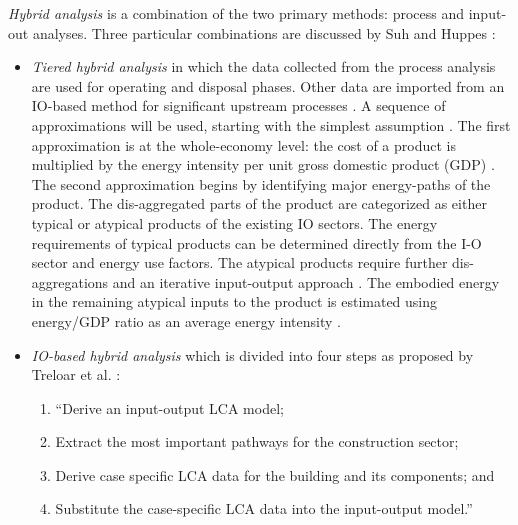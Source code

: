 \documentclass[10pt]{article}
\begin{document}

\textit{Hybrid analysis} is a combination of the two primary methods: process and input-out analyses. Three particular combinations are discussed by Suh and Huppes \cite{suh2005methods}:


\begin{itemize}
  \item \textit{Tiered hybrid analysis} in which the data collected from the process analysis are used for operating and disposal phases. Other data are imported from an IO-based method for significant upstream processes \cite{suh2005methods}.   A sequence of approximations will be used, starting with the simplest assumption \cite{bullard1978net}. The first approximation is at the whole-economy level: the cost of a product is multiplied by the energy intensity per unit gross domestic product  (GDP) \cite{bilec2006example}. The second approximation begins by identifying major energy-paths of the product. The dis-aggregated parts of the product are categorized as either typical or atypical products of the existing IO sectors. The energy requirements of typical products can be determined directly from the I-O sector and energy use factors. The atypical products require further dis-aggregations and an iterative input-output approach \cite{bilec2006example}. The embodied energy in the remaining atypical inputs to the product is estimated using energy/GDP ratio as an average energy intensity \cite{bullard1978net}.

  \item \textit{IO-based hybrid analysis} which is divided into four steps as proposed by Treloar et al. \cite{treloar2000hybrid}: 
  
  \begin{enumerate}
      \item ``Derive an input-output LCA model;
      \item Extract the most important pathways for the construction sector;
      \item Derive case specific LCA data for the building and its components; and
   \item Substitute the case-specific LCA data into the input-output model.'' \cite{treloar2000hybrid}
  \end{enumerate}
  

\end{itemize}
\end{document}
